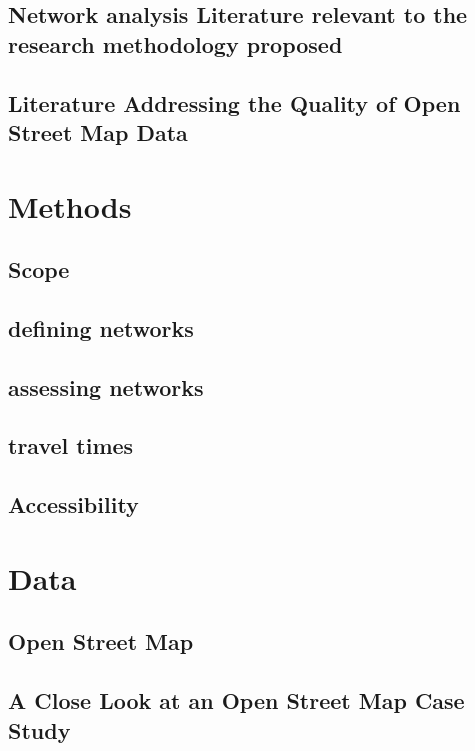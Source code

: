 \documentclass[11pt]{article} %
\begin{document}
\subsection{Network analysis Literature relevant to the research methodology proposed}

\subsection{Literature Addressing the Quality of Open Street Map Data}

\section{Methods}

\subsection{Scope}

\subsection{defining networks}

\subsection{assessing networks}

\subsection{travel times}

\subsection{Accessibility}

\section{Data}

\subsection{Open Street Map}

\subsection{A Close Look at an Open Street Map Case Study}
\end{document}
